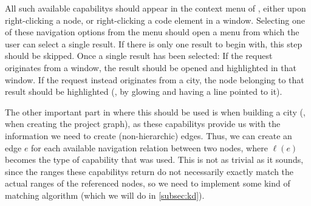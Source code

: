 \documentclass[../thesis]{subfiles}
\begin{document}
All such available \glspl{capability} should appear in the context menu of \SEE{}, either upon right-clicking a node, or right-clicking a code element in a \gls{window}.
Selecting one of these navigation options from the menu should open a menu from which the user can select a single result.
If there is only one result to begin with, this step should be skipped.
Once a single result has been selected:
If the request originates from a \gls{window}, the result should be opened and highlighted in that window.
If the request instead originates from a \gls{city}, the node belonging to that result should be highlighted (\eg, by glowing and having a line pointed to it).

The other important part in \SEE{} where this should be used is when building a city (\ie, when creating the project graph), as these \glspl{capability} provide us with the information we need to create (non-hierarchic) edges.
Thus, we can create an edge $e$ for each available navigation relation between two nodes, where $\ell(e)$ becomes the type of \gls{capability} that was used.
This is not as trivial as it sounds, since the \glspl{range} these \glspl{capability} return do not necessarily exactly match the actual \glspl{range} of the referenced nodes, so we need to implement some kind of matching algorithm (which we will do in \cref{subsec:kd}).
\end{document}
